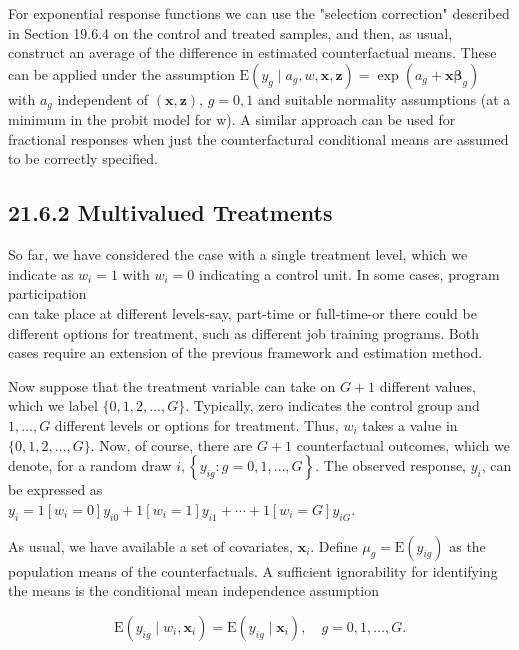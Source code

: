 \documentclass[10pt]{article}
\begin{document}
For exponential response functions we can use the "selection correction" described in Section 19.6.4 on the control and treated samples, and then, as usual, construct an average of the difference in estimated counterfactual means. These can be applied under the assumption $\mathrm{E}\left(y_{g} \mid a_{g}, w, \mathbf{x}, \mathbf{z}\right)=\exp \left(a_{g}+\mathbf{x} \boldsymbol{\beta}_{g}\right)$ with $a_{g}$ independent of $(\mathbf{x}, \mathbf{z})$, $g=0,1$ and suitable normality assumptions (at a minimum in the probit model for w). A similar approach can be used for fractional responses when just the counterfactural conditional means are assumed to be correctly specified.

\subsection*{21.6.2 Multivalued Treatments}
So far, we have considered the case with a single treatment level, which we indicate as $w_{i}=1$ with $w_{i}=0$ indicating a control unit. In some cases, program participation\\
can take place at different levels-say, part-time or full-time-or there could be different options for treatment, such as different job training programs. Both cases require an extension of the previous framework and estimation method.

Now suppose that the treatment variable can take on $G+1$ different values, which we label $\{0,1,2, \ldots, G\}$. Typically, zero indicates the control group and $1, \ldots, G$ different levels or options for treatment. Thus, $w_{i}$ takes a value in $\{0,1,2, \ldots, G\}$. Now, of course, there are $G+1$ counterfactual outcomes, which we denote, for a random draw $i,\left\{y_{i g}: g=0,1, \ldots, G\right\}$. The observed response, $y_{i}$, can be expressed as\\
$y_{i}=1\left[w_{i}=0\right] y_{i 0}+1\left[w_{i}=1\right] y_{i 1}+\cdots+1\left[w_{i}=G\right] y_{i G}$.

As usual, we have available a set of covariates, $\mathbf{x}_{i}$. Define $\mu_{g}=\mathrm{E}\left(y_{i g}\right)$ as the population means of the counterfactuals. A sufficient ignorability for identifying the means is the conditional mean independence assumption


\begin{equation*}
\mathrm{E}\left(y_{i g} \mid w_{i}, \mathbf{x}_{i}\right)=\mathrm{E}\left(y_{i g} \mid \mathbf{x}_{i}\right), \quad g=0,1, \ldots, G . \tag{21.116}
\end{equation*}
\end{document}
